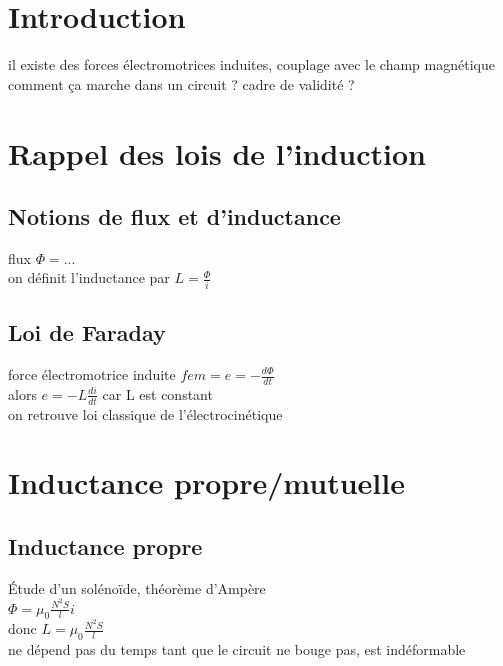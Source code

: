 


\biblio{}

\section*{Introduction}
il existe des forces électromotrices induites, couplage avec le champ magnétique \\
comment ça marche dans un circuit ? cadre de validité ? \\

\section{Rappel des lois de l'induction}
\subsection{Notions de flux et d'inductance}
flux $\Phi=...$ \\
on définit l'inductance par $L=\frac{\Phi}{i}$ \\
\subsection{Loi de Faraday}
force électromotrice induite $fem=e=-\frac{d\Phi}{dt}$ \\
alors $e=-L \frac{di}{dt}$ car L est constant \\
on retrouve loi classique de l'électrocinétique
\section{Inductance propre/mutuelle}
\subsection{Inductance propre}
Étude d'un solénoïde, théorème d'Ampère \\
$\Phi=\mu_0 \frac{N^2 S}{l}i$ \\
donc $L=\mu_0 \frac{N^2 S}{l}$ \\
ne dépend pas du temps tant que le circuit ne bouge pas, est indéformable  \\

